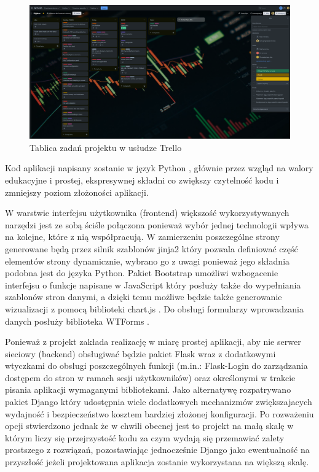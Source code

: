\documentclass[a4paper, 10pt, twoside, openright]{report}
\begin{document}
\begin{large}
\begin{figure}[H]           %
    \centering
    \includegraphics[width=12cm]{figures/trello_kanban.png}
    \caption{Tablica zadań projektu w usłudze Trello}
    \label{fig:trello}
\end{figure}

{Kod aplikacji napisany zostanie w język Python \cite{Python}, głównie przez 
wzgląd na walory edukacyjne i prostej, ekspresywnej składni co zwiększy 
czytelność kodu i zmniejszy poziom złożoności aplikacji.}

{W warstwie interfejsu użytkownika (frontend) większość wykorzystywanych 
narzędzi jest ze sobą ściśle połączona ponieważ wybór jednej technologii 
wpływa na kolejne, które z nią współpracują. W zamierzeniu poszczególne strony 
generowane będą przez silnik szablonów jinja2 \cite{jinja} który pozwala 
definiować część elementów strony dynamicznie, wybrano go z uwagi ponieważ jego 
składnia podobna jest do języka Python. Pakiet Bootstrap \cite{Bootstrap} 
umożliwi wzbogacenie interfejsu o funkcje napisane w JavaScript 
\cite{JavaScript} który posłuży także do wypełniania szablonów stron danymi, a 
dzięki temu możliwe będzie także generowanie wizualizacji z pomocą biblioteki 
chart.js \cite{chart.js}. Do obsługi formularzy wprowadzania danych posłuży 
biblioteka WTForms \cite{WTForms}.}

{Ponieważ z projekt zakłada realizację w miarę prostej aplikacji, aby nie 
serwer sieciowy (backend) obsługiwać będzie pakiet Flask \cite{Flask} wraz z 
dodatkowymi wtyczkami do obsługi poszczególnych funkcji (m.in.: Flask-Login 
\cite{Flask-Login} do zarządzania dostępem do stron w ramach sesji użytkowników) 
oraz określonymi w trakcie pisania aplikacji wymaganymi bibliotekami. 
Jako alternatywę rozpatrywano pakiet Django \cite{Django} który udostępnia 
wiele dodatkowych mechanizmów zwiększajacych wydajność i bezpieczeństwo kosztem 
bardziej złożonej konfiguracji. Po rozważeniu opcji stwierdzono jednak że w 
chwili obecnej jest to projekt na małą skalę w którym liczy się przejrzystość 
kodu za czym wydają się przemawiać zalety prostszego z rozwiązań, pozostawiając 
jednocześnie Django jako ewentualność na przyszłość jeżeli projektowana 
aplikacja zostanie wykorzystana na większą skalę.}


\end{large}
\end{document}
